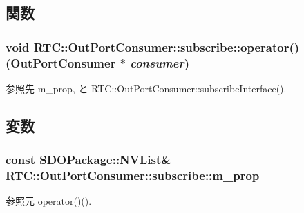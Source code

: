 \subsection{関数}
\subsubsection[{operator()}]{\setlength{\rightskip}{0pt plus 5cm}void RTC::OutPortConsumer::subscribe::operator() ({\bf OutPortConsumer} $\ast$ {\em consumer})\hspace{0.3cm}{\ttfamily  [inline]}}\label{structRTC_1_1OutPortConsumer_1_1subscribe_a28e112bf1d72f93ced02bf2df2384f1f}


参照先 m\_\-prop, と RTC::OutPortConsumer::subscribeInterface().



\subsection{変数}
\subsubsection[{m\_\-prop}]{\setlength{\rightskip}{0pt plus 5cm}const SDOPackage::NVList\& {\bf RTC::OutPortConsumer::subscribe::m\_\-prop}}\label{structRTC_1_1OutPortConsumer_1_1subscribe_ac9867bea2bfd51b305b2c4770f4acf19}


参照元 operator()().

